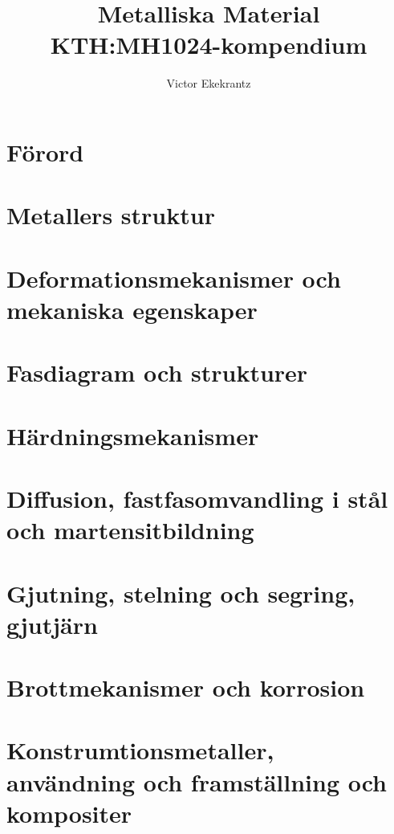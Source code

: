\documentclass[11pt,a4paper]{article}
\title{Metalliska Material\\KTH:MH1024-kompendium}
\author{Victor Ekekrantz}
\begin{document}
 \maketitle

\newpage
\section*{Förord}
% 
\tableofcontents

\newpage {}

\newpage
\section{Metallers struktur}

\newpage
\section{Deformationsmekanismer och mekaniska egenskaper}

\newpage
\section{Fasdiagram och strukturer}

\newpage
\section{Härdningsmekanismer}

\newpage
\section{Diffusion, fastfasomvandling i stål och martensitbildning}

\newpage
\section{Gjutning, stelning och segring, gjutjärn}

\newpage
\section{Brottmekanismer och korrosion}

\newpage
\section{Konstrumtionsmetaller, användning och framställning och kompositer}

\newpage
{}

\end{document}
